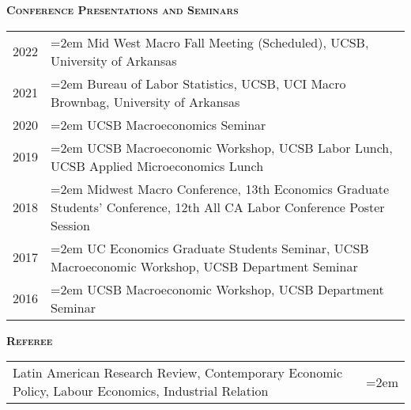 \documentclass[11pt]{article}
\newenvironment{rSection}[1]{ %
  {\large\bf\textsc{#1}}
  \vspace{0.15cm}
  \begin{list}{}{ %
    \setlength{\leftmargin}{1.5em} %
    \setlength{\rightmargin}{1.5em}
  }
  \item[]
}{
  \end{list}
  \vspace{0.15cm}
}
\begin{document}
\begin{rSection}{Conference Presentations and Seminars}
\begin{tabularx}{\linewidth}{l >{\hangindent=2em}X}
2022 & Mid West Macro Fall Meeting (Scheduled), UCSB, University of Arkansas\\
2021 & Bureau of Labor Statistics, UCSB, UCI Macro Brownbag, University of Arkansas \\
2020 & UCSB Macroeconomics Seminar\\
2019 & UCSB Macroeconomic Workshop, UCSB Labor Lunch, UCSB Applied Microeconomics Lunch\\
2018 & Midwest Macro Conference, 13th Economics Graduate Students' Conference, 12th All CA Labor Conference Poster Session\\
2017 & UC Economics Graduate Students Seminar, UCSB Macroeconomic Workshop, UCSB Department Seminar\\
2016 & UCSB Macroeconomic Workshop, UCSB Department Seminar\\
\end{tabularx}
\end{rSection}

\begin{rSection}{Referee}
\begin{tabularx}{\linewidth}{l >{\hangindent=2em}X}
Latin American Research Review, Contemporary Economic Policy, Labour Economics, Industrial Relation
\end{tabularx}
\end{rSection}
\end{document}
